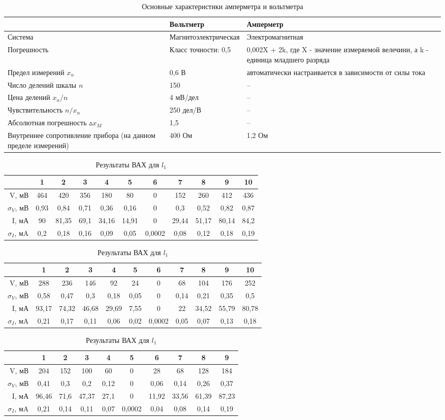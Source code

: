 \documentclass[a4paper, 10pt]{article}%
\begin{document}
\begin{table}
\caption{Основные характеристики амперметра и вольтметра}
\begin{tabular}{|p{3cm}|p{5cm}|p{5cm}|}
\hline
& Вольтметр & Амперметр \\
\hline
Система & Магнитоэлектрическая & Электромагнитная\\
\hline
Погрешность& Класс точности: 0,5& 0,002X + 2k, где X - значение измеряемой велечини, а k - единица младшего разряда\\
\hline
Предел измерений $ x_{n} $& 0,6 В & автоматически настраивается в зависимости от силы тока \\
\hline
Число делений шкалы $n$& 150 & -- \\
\hline
Цена делений $x_n / n$& 4 мВ/дел & -- \\
\hline
Чувствительность $ n / x_n$& 250 дел/В & --\\
\hline
Абсолютная погрешность $ \vartriangle x_M$& 1,5&--\\
\hline
Внутреннее сопротивление прибора (на данном пределе измерений)& 400 Ом & 1,2 Ом\\
\hline
\end{tabular}
\end{table}
\begin{table}
\caption{Результаты ВАХ для $l_1$}
\begin{tabular}{|r|c|c|c|c|c|c|c|c|c|c|}
\hline
&1&2&3&4&5&6&7&8&9&10 \\
\hline
V, мВ&464&420&356&180&80&0&152&260&412&436 \\
\hline
$\sigma_V$, мВ& 0,93&0,84&0,71&0,36&0,16&0&0,3&0,52&0,82&0,87 \\
\hline
 I, мА&90&81,35&69,1&34,16&14,91&0&29,44&51,17&80,14&84,2 \\
 \hline
 $\sigma_I$, мA&0,2&0,18&0,16&0,09&0,05&0,0002&0,08&0,12&0,18&0,19 \\
 \hline
\end{tabular}
\caption{Результаты ВАХ для $l_2$}
\begin{tabular}{|r|c|c|c|c|c|c|c|c|c|c|}
\hline
&1&2&3&4&5&6&7&8&9&10 \\
\hline
V, мВ&288&236&146&92&24&0&68&104&176&252 \\
\hline
$\sigma_V$, мВ&0,58&0,47&0,3&0,18&0,05&0&0,14&0,21&0,35&0,5 \\
\hline
 I, мА&93,17&74,32&46,68&29,69&7,55&0&22&34,52&55,79&80,78 \\
 \hline
 $\sigma_I$, мA&0,21&0,17&0,11&0,06&0,02&0,0002&0,05&0,07&0,13&0,18 \\
 \hline
\end{tabular}
\caption{Результаты ВАХ для $l_1$}
\begin{tabular}{|r|c|c|c|c|c|c|c|c|c|}
\hline
&1&2&3&4&5&6&7&8&9 \\
\hline
V, мВ&204&152&100&60&0&28&68&128&184 \\
\hline
$\sigma_V$, мВ&0,41&0,3&0,2&0,12&0&0,06&0,14&0,26&0,37 \\
\hline
 I, мА&96,46&71,6&47,37&27,1&0&11,92&33,56&61,39&87,23 \\
 \hline
 $\sigma_I$, мA&0,21&0,14&0,11&0,07&0,0002&0,04&0,08&0,14&0,19 \\
 \hline
\end{tabular}
\end{table}
\end{document}
